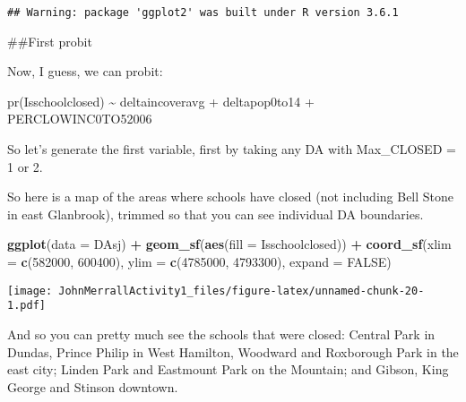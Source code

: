 \documentclass[]{article}
\newenvironment{Shaded}{\begin{snugshade}}{\end{snugshade}}
\newcommand{\DataTypeTok}[1]{\textcolor[rgb]{0.13,0.29,0.53}{#1}}
\newcommand{\DecValTok}[1]{\textcolor[rgb]{0.00,0.00,0.81}{#1}}
\newcommand{\KeywordTok}[1]{\textcolor[rgb]{0.13,0.29,0.53}{\textbf{#1}}}
\newcommand{\NormalTok}[1]{#1}
\newcommand{\OperatorTok}[1]{\textcolor[rgb]{0.81,0.36,0.00}{\textbf{#1}}}
\newcommand{\OtherTok}[1]{\textcolor[rgb]{0.56,0.35,0.01}{#1}}
\newcommand{\StringTok}[1]{\textcolor[rgb]{0.31,0.60,0.02}{#1}}
\begin{document}
\begin{verbatim}
## Warning: package 'ggplot2' was built under R version 3.6.1
\end{verbatim}

\#\#First probit

Now, I guess, we can probit:

pr(Isschoolclosed) \textasciitilde{} deltaincoveravg + deltapop0to14 +
PERCLOWINC0TO52006

So let's generate the first variable, first by taking any DA with
Max\_CLOSED = 1 or 2.

\begin{Shaded}
\end{Shaded}

So here is a map of the areas where schools have closed (not including
Bell Stone in east Glanbrook), trimmed so that you can see individual DA
boundaries.

\begin{Shaded}
\begin{Highlighting}[]
\KeywordTok{ggplot}\NormalTok{(}\DataTypeTok{data =}\NormalTok{ DAsj) }\OperatorTok{+}\StringTok{ }\KeywordTok{geom_sf}\NormalTok{(}\KeywordTok{aes}\NormalTok{(}\DataTypeTok{fill =}\NormalTok{ Isschoolclosed)) }\OperatorTok{+}
\StringTok{  }\KeywordTok{coord_sf}\NormalTok{(}\DataTypeTok{xlim =} \KeywordTok{c}\NormalTok{(}\DecValTok{582000}\NormalTok{, }\DecValTok{600400}\NormalTok{), }\DataTypeTok{ylim =} \KeywordTok{c}\NormalTok{(}\DecValTok{4785000}\NormalTok{, }\DecValTok{4793300}\NormalTok{), }\DataTypeTok{expand =} \OtherTok{FALSE}\NormalTok{)}
\end{Highlighting}
\end{Shaded}

\texttt{[image: JohnMerrallActivity1\_files/figure-latex/unnamed-chunk-20-1.pdf]}

And so you can pretty much see the schools that were closed: Central
Park in Dundas, Prince Philip in West Hamilton, Woodward and Roxborough
Park in the east city; Linden Park and Eastmount Park on the Mountain;
and Gibson, King George and Stinson downtown.
\end{document}
